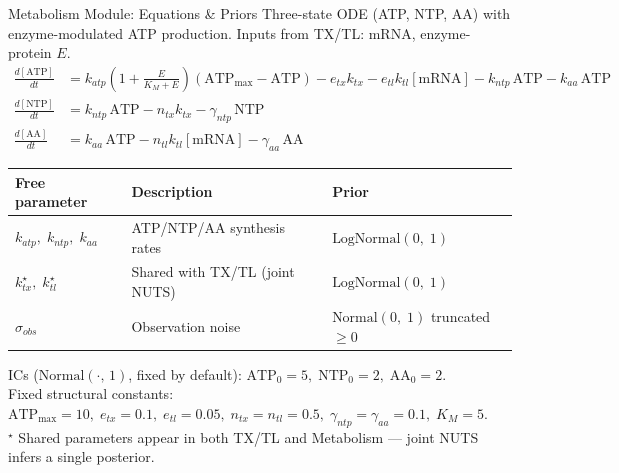 \documentclass[aspectratio=169]{beamer}
\begin{document}
\begin{frame}[noframenumbering]{Metabolism Module: Equations \& Priors}
	\footnotesize
	Three-state ODE (ATP, NTP, AA) with enzyme-modulated ATP production. Inputs from TX/TL: mRNA, enzyme-protein $E$.
	\begin{align*}
		\frac{d[\text{ATP}]}{dt} &= k_{atp}\!\left(1 + \tfrac{E}{K_M + E}\right)\!(\text{ATP}_{\max} - \text{ATP}) - e_{tx} k_{tx} - e_{tl} k_{tl}[\text{mRNA}] - k_{ntp}\,\text{ATP} - k_{aa}\,\text{ATP} \\[2pt]
		\frac{d[\text{NTP}]}{dt} &= k_{ntp}\,\text{ATP} - n_{tx} k_{tx} - \gamma_{ntp}\,\text{NTP} \\[2pt]
		\frac{d[\text{AA}]}{dt}  &= k_{aa}\,\text{ATP} - n_{tl} k_{tl}[\text{mRNA}] - \gamma_{aa}\,\text{AA}
	\end{align*}

	\smallskip
	\begin{tabular}{lll}
		\toprule
		\textbf{Free parameter} & \textbf{Description} & \textbf{Prior} \\
		\midrule
		$k_{atp},\; k_{ntp},\; k_{aa}$ & ATP/NTP/AA synthesis rates & $\text{LogNormal}(0,\;1)$ \\
		$k_{tx}^\star,\; k_{tl}^\star$ & Shared with TX/TL (joint NUTS) & $\text{LogNormal}(0,\;1)$ \\
		$\sigma_{obs}$ & Observation noise & $\text{Normal}(0,\;1)$ truncated $\geq 0$ \\
		\bottomrule
	\end{tabular}

	\smallskip
	{\scriptsize ICs ($\text{Normal}(\cdot,\,1)$, fixed by default): $\text{ATP}_0{=}5,\; \text{NTP}_0{=}2,\; \text{AA}_0{=}2$.\\
	Fixed structural constants: $\text{ATP}_{\max}{=}10,\; e_{tx}{=}0.1,\; e_{tl}{=}0.05,\; n_{tx}{=}n_{tl}{=}0.5,\; \gamma_{ntp}{=}\gamma_{aa}{=}0.1,\; K_M{=}5$.\\
	$^\star$ Shared parameters appear in both TX/TL and Metabolism --- joint NUTS infers a single posterior.}
\end{frame}
\end{document}
